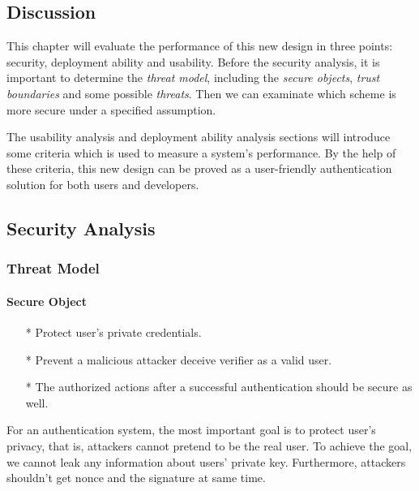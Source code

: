 \begin{CJK}{Bg5}{bsmi}


\chapter{Discussion}
\label{cha:discussion}

This chapter will evaluate the performance of this new design in three points: security, deployment ability and usability. Before the security analysis, it is important to determine the \emph{threat model}\cite{threat-model}, including the \emph{secure objects}, \emph{trust boundaries} and some possible \emph{threats}. Then we can examinate which scheme is more secure under a specified assumption.

The usability analysis and deployment ability analysis sections will introduce some criteria which is used to measure a system's performance. By the help of these criteria, this new design can be proved as a user-friendly authentication solution for both users and developers.

\section{Security Analysis}

\subsection{Threat Model}

\subsubsection{Secure Object}

\begin{enumerate}
\item[*] Protect user's private credentials.
\item[*] Prevent a malicious attacker deceive verifier as a valid user.
\\
\item[*] The authorized actions after a successful authentication should be secure as well.
\end{enumerate}

For an authentication system, the most important goal is to protect user's privacy, that is, attackers cannot pretend to be the real user. To achieve the goal, we cannot leak any information about users' private key. Furthermore, attackers shouldn't get nonce and the signature at same time.


\end{CJK}
